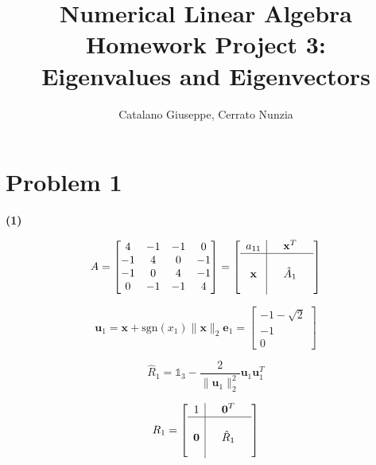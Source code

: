 \documentclass[a4paper,11pt]{article}
\begin{document}
	\author{Catalano Giuseppe, Cerrato Nunzia}
	\title{Numerical Linear Algebra Homework Project 3:\\Eigenvalues and Eigenvectors}
	\date{}
	\maketitle
	
\section*{Problem 1}
\textbf{(1)}

\begin{equation}
	A = \begin{bmatrix}
		4 & -1 & -1 & 0 \\
		-1 & 4 & 0 & -1 \\
		-1 & 0 & 4 & -1 \\
		0 & -1 & -1 & 4
\end{bmatrix} = \left[ 
\begin{array}{c|ccc}
	a_{11}&  & \textbf{x}^T  &  \\
	\hline
	&  &  &  \\
	\textbf{x}&  & \hat{A}_1 &  \\
	&  &  & 
\end{array}\right] 
\end{equation}

\begin{equation}\label{key}
	\textbf{u}_1 = \textbf{x} + \text{sgn}(x_1) \lVert \textbf{x}\rVert_2 \textbf{e}_1 = \begin{bmatrix}
		-1-\sqrt{2}\\
		-1\\
		0
	\end{bmatrix}
\end{equation}

\begin{equation}\label{key}
	\hat{R}_1 = \mathbb{1}_3 - \frac{2}{\lVert \textbf{u}_1\rVert_2^2} \textbf{u}_1 \textbf{u}_1^T
\end{equation}


\begin{equation}\label{key}
	R_1 = \left[ 
	\begin{array}{c|ccc}
		1 &  & \textbf{0}^T  &  \\
		\hline
		&  &  &  \\
		\textbf{0}&  & \hat{R}_1 &  \\
		&  &  & 
	\end{array}\right] 
\end{equation}
	
\end{document}
